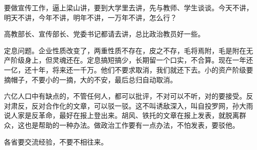 要做宣传工作，逼上梁山讲，要到大学里去讲，先与教师、学生谈谈。今天不讲，明天不讲，今年不讲，明年不讲，一万年不讲，怎么行？

高教部长、宣传部长、党委书记都请去讲，总比政治教员好一些。

定息问题。企业性质改变了，两重性质不存在，皮之不存，毛将焉附，毛是附在无产阶级身上，但灵魂还在。定息搞短搞少，长期留一个口实，不合算。现在一年还一亿，还十年，将来还一千万。他们不要求取消，我们就还下去。小的资产阶级要摘帽子，不要小的一摘，大的不安，最后总归自动取消。

六亿人口中有缺点的，不管任何人，都可以批评，不对可以不听，对的要接受。反对肃反，反对合作化的文章，可以驳一驳。这不叫诱敌深入，叫自投罗网，孙大雨说人家是反革命，最好在报上登出来。胡风、铁托的文章在报上发表，就脱离群众，这也是帮助的一种办法。做政治工作要有一点办法，不怕发表，要驳他。

各省要交流经验，不要不相往来。


